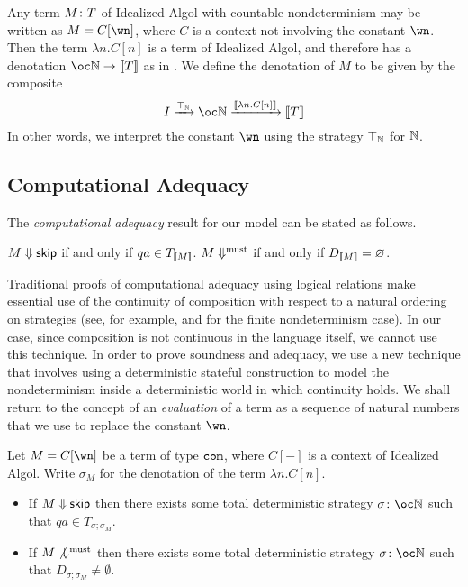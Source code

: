 \documentclass[sigplan,10pt,review]{acmart}\settopmatter{printfolios=true,printccs=false,printacmref=false}
\begin{document}
Any term $M\colon T$ of Idealized Algol with countable nondeterminism may be written as $M = C[\wn]$, where $C$ is a context not involving the constant $\wn$.  
Then the term $\lambda n.C[n]$ is a term of Idealized Algol, and therefore has a denotation $\oc\bN \to \deno{T}$ as in \cite{SamsonGuyIAPassive}.
We define the denotation of $M$ to be given by the composite
\[
  I \xrightarrow{\top_{\bN}}
  \oc \bN \xrightarrow{\deno{\lambda n.C[n]}}
  \deno{T}
  \]
In other words, we interpret the constant $\wn$ using the strategy $\top_{\mathbb{N}}$ for $\mathbb{N}$.

\subsection{Computational Adequacy}

The \emph{computational adequacy} result for our model can be stated as follows.

\begin{proposition}
  $M\Downarrow{\mathsf{skip}}$ if and only if $qa\in T_{\left\llbracket M\right\rrbracket}$.  
  $M\Downarrow^{\text{must}}$ if and only if $D_{\left\llbracket M\right\rrbracket}=\varnothing$.
  \label{prop:adequacy}
\end{proposition}

Traditional proofs of computational adequacy using logical relations make essential use of the continuity of composition with respect to a natural ordering on strategies (see, for example, \cite{mcCHFiniteND} and \cite{RusssThesis} for the finite nondeterminism case).  
In our case, since composition is not continuous in the language itself, we cannot use this technique.
In order to prove soundness and adequacy, we use a new technique that involves using a deterministic stateful construction to model the nondeterminism inside a deterministic world in which continuity holds.  
We shall return to the concept of an \emph{evaluation} of a term as a sequence of natural numbers that we use to replace the constant $\wn$.  

\begin{lemma}
  Let $M=C[\wn]$ be a term of type ${\mathtt{com}}$, where $C[-]$ is a context of Idealized Algol.
  Write $\sigma_M$ for the denotation of the term $\lambda n.C[n]$.  
  \begin{itemize}
    \item If $M\Downarrow{\mathsf{skip}}$ then there exists some total deterministic strategy $\sigma\from\oc\bN$ such that $qa\in T_{\sigma;\sigma_M}$.
    \item If $M\not{\Downarrow^{\text{must}}}$ then there exists some total deterministic strategy $\sigma\from\oc\bN$ such that $D_{\sigma;\sigma_M}\ne\emptyset$.
  \end{itemize}
  \label{lem:soundness-lemma}
\end{lemma}
\end{document}
